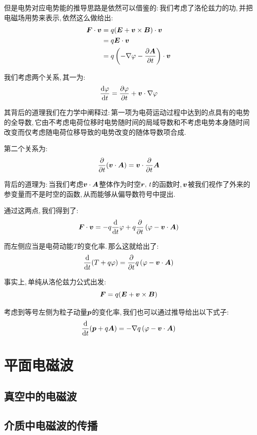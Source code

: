 但是电势对应电势能的推导思路是依然可以借鉴的:\,我们考虑了洛伦兹力的功,\,并把电磁场用势来表示,\,依然这么做给出:
\begin{align*}
\boldsymbol{F}\cdot \boldsymbol{v} &=q(\boldsymbol{E}+\boldsymbol{v}\times \boldsymbol{B})\cdot \boldsymbol{v}\\
&=q\boldsymbol{E}\cdot \boldsymbol{v}\\
&=q \left(-\nabla \varphi-\frac{\partial \boldsymbol{A}}{\partial t}\right)\cdot \boldsymbol{v}
\end{align*}

我们考虑两个关系,\,其一为:
\[\frac{\textrm{d} \varphi}{\textrm{d} t}=\frac{\partial \varphi}{\partial t}+\boldsymbol{v}\cdot \nabla\varphi\]

其背后的道理我们在力学中阐释过:\,第一项为电荷运动过程中达到的点具有的电势的全导数,\,它由不考虑电荷位移时电势随时间的局域导数和不考虑电势本身随时间改变而仅考虑随电荷位移导致的电势改变的随体导数项合成.

第二个关系为:
\[\frac{\partial}{\partial t}(\boldsymbol{v}\cdot \boldsymbol{A})=\boldsymbol{v}\cdot \frac{\partial}{\partial t}\boldsymbol{A}\]

背后的道理为:\,当我们考虑$\boldsymbol{v}\cdot \boldsymbol{A}$整体作为时空$\boldsymbol{r},\,t$的函数时,\,$\boldsymbol{v}$被我们视作了外来的参变量而不是时空的函数,\,从而能够从偏导数符号中提出.

通过这两点,\,我们得到了:
\[\boldsymbol{F}\cdot \boldsymbol{v} =-q\frac{\textrm{d}}{\textrm{d} t}\varphi+q\frac{\partial}{\partial t}\left(\varphi-\boldsymbol{v}\cdot\boldsymbol{A}\right)\]

而左侧应当是电荷动能$T$的变化率.\,那么这就给出了:
\[\frac{\textrm{d}}{\textrm{d} t}(T+q\varphi)=\frac{\partial}{\partial t}q\left(\varphi-\boldsymbol{v}\cdot\boldsymbol{A}\right)\]

事实上,\,单纯从洛伦兹力公式出发:
\[\boldsymbol{F}=q(\boldsymbol{E}+\boldsymbol{v}\times \boldsymbol{B})\]

考虑到等号左侧为粒子动量$\boldsymbol{p}$的变化率,\,我们也可以通过推导给出以下式子:
\[\frac{\textrm{d}}{\textrm{d} t}(\boldsymbol{p}+q\boldsymbol{A})=-\nabla q\left(\varphi-\boldsymbol{v}\cdot\boldsymbol{A}\right)\]


\section{平面电磁波}

\subsection{真空中的电磁波}

\subsection{介质中电磁波的传播}

